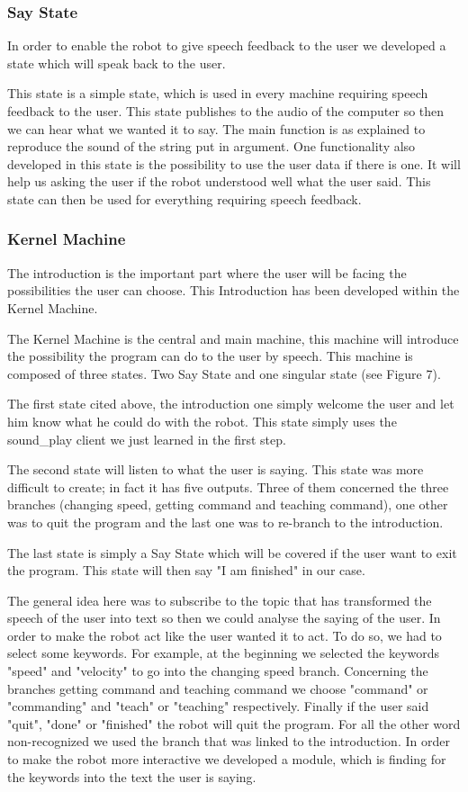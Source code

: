 \subsubsection{Say State}
In order to enable the robot to give speech feedback to the user we developed a state which will speak back to the user.

This state is a simple state, which is used in every machine requiring speech feedback to the user. This state publishes to the audio of the computer so then we can hear what we wanted it to say.
The main function is as explained to reproduce the sound of the string put in argument. One functionality also developed in this state is the possibility to use the user data if there is one. It will help us asking the user if the robot understood well what the user said. 
This state can then be used for everything requiring speech feedback.

\subsubsection{Kernel Machine}
The introduction is the important part where the user will be facing the possibilities the user can choose. This Introduction has been developed within the Kernel Machine.

The Kernel Machine is the central and main machine, this machine will introduce the possibility the program can do to the user by speech. This machine is composed of three states. Two Say State and one singular state (see Figure 7).

The first state cited above, the introduction one simply welcome the user and let him know what he could do with the robot. This state simply uses the sound\_play client we just learned in the first step.

The second state will listen to what the user is saying. This state was more difficult to create; in fact it has five outputs. Three of them concerned the three branches (changing speed, getting command and teaching command), one other was to quit the program and the last one was to re-branch to the introduction. 

The last state is simply a Say State which will be covered if the user want to exit the program. This state will then say "I am finished" in our case.

The general idea here was to subscribe to the topic that has transformed the speech of the user into text so then we could analyse the saying of the user. In order to make the robot act like the user wanted it to act. To do so, we had to select some keywords. For example, at the beginning we selected the keywords "speed" and "velocity" to go into the changing speed branch. Concerning the branches getting command and teaching command we choose "command" or "commanding" and "teach" or "teaching" respectively. Finally if the user said "quit", "done" or "finished" the robot will quit the program. For all the other word non-recognized we used the branch that was linked to the introduction.
In order to make the robot more interactive we developed a module, which is finding for the keywords into the text the user is saying. 

